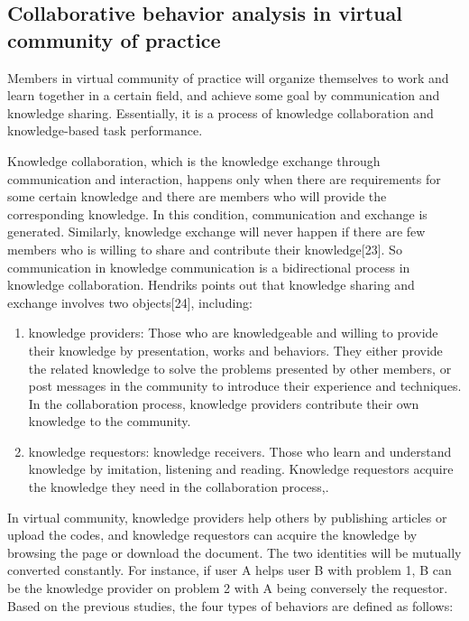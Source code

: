 \documentclass{elsarticle}
\begin{document}
\subsection{Collaborative behavior analysis in virtual community of practice }
\label{sec:coll-behav-analys}

Members in virtual community of practice will organize themselves to work and learn together in a certain field, and achieve some goal by communication and knowledge sharing. Essentially, it is a process of knowledge collaboration and knowledge-based task performance.  

Knowledge collaboration, which is the knowledge exchange through
communication and interaction, happens only when there are
requirements for some certain knowledge and there are members who will
provide the corresponding knowledge. In this condition, communication
and exchange is generated. Similarly, knowledge exchange will never
happen if there are few members who is willing to share and contribute
their knowledge[23]. So communication in knowledge communication is a
bidirectional process in knowledge collaboration. Hendriks points out
that knowledge sharing and exchange involves two objects[24],
including:
\begin{enumerate}
\item knowledge providers: Those who are knowledgeable and willing to provide their knowledge by presentation, works and behaviors. They either provide the related knowledge to solve the problems presented by other members, or post messages in the community to introduce their experience and techniques. In the collaboration process, knowledge providers contribute their own knowledge to the community.  
\item knowledge requestors: knowledge receivers. Those who learn and
  understand knowledge by imitation, listening and reading. Knowledge
  requestors acquire the knowledge they need in the collaboration
  process,.

\end{enumerate}
In virtual community, knowledge providers help others by publishing articles or upload the codes, and knowledge requestors can acquire the knowledge by browsing the page or download the document. The two identities will be mutually converted constantly. For instance, if user A helps user B with problem 1, B can be the knowledge provider on problem 2 with A being conversely the requestor. Based on the previous studies, the four types of behaviors are defined as follows:
\end{document}
